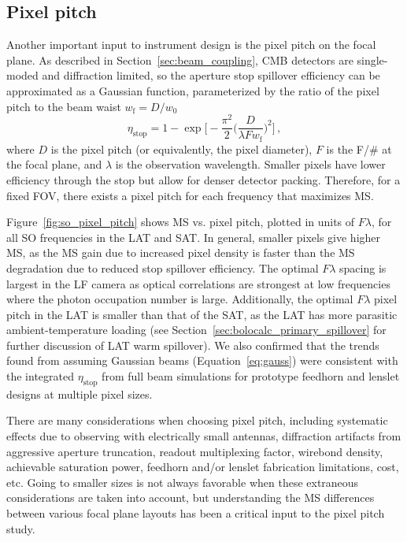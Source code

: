 
\subsection{Pixel pitch}
\label{sec:bolocalc_pixel_pitch}

Another important input to instrument design is the pixel pitch on the focal plane. As described in Section~\ref{sec:beam_coupling}, CMB detectors are single-moded and diffraction limited, so the aperture stop spillover efficiency can be approximated as a Gaussian function, parameterized by the ratio of the pixel pitch to the beam waist $w_{\mathrm{f}} = D / w_{\mathrm{0}}$
\begin{equation}
	\eta_{\mathrm{stop}} = 1 - \exp \Big[ -\frac{\pi^{2}}{2} \Big( \frac{D}{\lambda F w_{\mathrm{f}}} \Big)^{2} \Big]\, ,
    \label{eq:gauss}
\end{equation}
where $D$ is the pixel pitch (or equivalently, the pixel diameter), $F$ is the F/\# at the focal plane, and $\lambda$ is the observation wavelength. Smaller pixels have lower efficiency through the stop but allow for denser detector packing. Therefore, for a fixed FOV, there exists a pixel pitch for each frequency that maximizes MS. 

Figure~\ref{fig:so_pixel_pitch} shows MS vs. pixel pitch, plotted in units of $F \lambda$, for all SO frequencies in the LAT and SAT. In general, smaller pixels give higher MS, as the MS gain due to increased pixel density is faster than the MS degradation due to reduced stop spillover efficiency. The optimal $F \lambda$ spacing is largest in the LF camera as optical correlations are strongest at low frequencies where the photon occupation number is large. Additionally, the optimal $F \lambda$ pixel pitch in the LAT is smaller than that of the SAT, as the LAT has more parasitic ambient-temperature loading (see Section~\ref{sec:bolocalc_primary_spillover} for further discussion of LAT warm spillover). We also confirmed that the trends found from assuming Gaussian beams (Equation~\ref{eq:gauss}) were consistent with the integrated $\eta_{\mathrm{stop}}$ from full beam simulations for prototype feedhorn and lenslet designs at multiple pixel sizes.

There are many considerations when choosing pixel pitch, including systematic effects due to observing with electrically small antennas,
diffraction artifacts from aggressive aperture truncation, %
readout multiplexing factor,
wirebond density,
achievable saturation power, 
feedhorn and/or lenslet fabrication limitations,
cost, etc. Going to smaller sizes is not always favorable when these extraneous considerations are taken into account, but understanding the MS differences between various focal plane layouts has been a critical input to the pixel pitch study.

